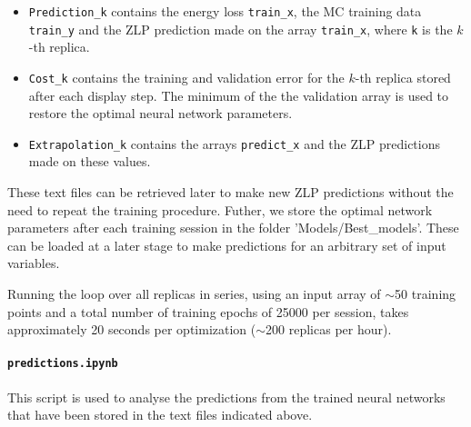 \begin{itemize}

\item {\tt Prediction\_k} contains the energy loss {\tt train\_x}, the MC training data {\tt train\_y}
and the ZLP prediction made on the array {\tt train\_x}, where {\tt k} is the $k$-th replica. 
\item {\tt Cost\_k} contains the training and validation error for the
  $k$-th replica
stored after each display step. 
The minimum of the the validation array is used to restore the optimal
neural network parameters.
\item {\tt Extrapolation\_k} contains the arrays {\tt predict\_x} and the ZLP predictions made on these values. 
\end{itemize}
These text files can be retrieved later to make new ZLP predictions
without the need to repeat the training procedure.
%
Futher, we store the optimal network parameters after each training session in the folder
'Models/Best\_models'. 
%
These can be loaded at a later stage
to make predictions for an arbitrary set of input variables. 

Running the loop over all replicas in series, using an input array of $\sim$50 training points 
and a total number of training epochs of 25000 per session,
takes approximately 20 seconds per optimization ($\sim$200 replicas per hour).





\noindent
\paragraph{\tt predictions.ipynb}
This script is used to analyse the predictions from the trained
neural networks that have been stored in the text files indicated above.

